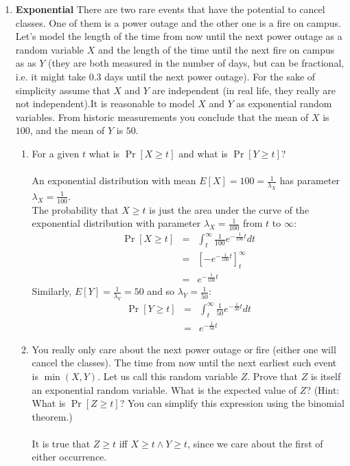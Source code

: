 \documentclass[11pt,fleqn]{article}
\begin{document}
\begin{enumerate}
\newpage
\item \textbf{Exponential} There are two rare events that have the potential to cancel classes. One of them is a power outage and the other one is a fire on campus. Let's model the length of the time from now until the next power outage as a random variable $X$ and the length of the time until the next fire on campus as as $Y$ (they are both measured in the number of days, but can be fractional, i.e. it might take 0.3 days until the next power outage). For the sake of simplicity assume that $X$ and $Y$ are independent (in real life, they really are not independent).It is reasonable to model $X$ and $Y$ as exponential random variables. From historic measurements you conclude that the mean of $X$ is $100$, and the mean of $Y$ is $50$.

\begin{enumerate}
\item For a given $t$ what is $\Pr[X\geq t]$ and what is $\Pr[Y\geq t]$? \\\\
An exponential distribution with mean $E[X] = 100 = \frac1{\lambda_X}$ has parameter $\lambda_X = \frac1{100}$. \\
The probability that $X\geq t$ is just the area under the curve of the exponential distribution with parameter $\lambda_X = \frac1{100}$ from $t$ to $\infty$:
\begin{eqnarray*}
\Pr[X\geq t] &=& \int_{t}^{\infty} \frac1{100}e^{-\frac1{100}t}dt \\
&=& [-e^{-\frac1{100}t}]_{t}^{\infty} \\
&=& e^{-\frac1{100}t}
\end{eqnarray*}
Similarly, $E[Y] = \frac1{\lambda_Y} = 50$ and so $\lambda_Y = \frac1{50}$:
\begin{eqnarray*}
\Pr[Y\geq t] &=& \int_{t}^{\infty} \frac1{50}e^{-\frac1{50}t}dt \\
&=& e^{-\frac1{50}t}
\end{eqnarray*}
\item You really only care about the next power outage or fire (either one will cancel the classes). The time from now until the next earliest such event is $\min(X,Y)$. Let us call this random variable $Z$. Prove that $Z$ is itself an exponential random variable. What is the expected value of $Z$? (Hint: What is $\Pr[Z\geq t]$? You can simplify this expression using the binomial theorem.) \\\\
It is true that $Z\geq t$ iff $X\geq t \wedge Y\geq t$, since we care about the first of either occurrence. \\

\end{enumerate}
\end{enumerate}
\end{document}
